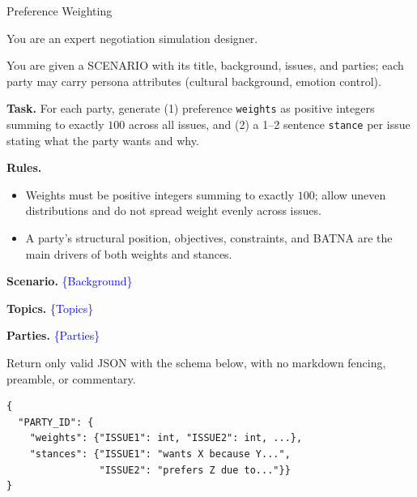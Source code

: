 \begin{table}[p]
\centering
\begin{promptbox}{Preference Weighting}
\begin{systembox}
\scriptsize
You are an expert negotiation simulation designer.

\smallskip
You are given a SCENARIO with its title, background, issues, and parties; each party may carry persona attributes (cultural background, emotion control).

\smallskip
\textbf{Task.} For each party, generate (1) preference \texttt{weights} as positive integers summing to exactly $100$ across all issues, and (2) a 1--2 sentence \texttt{stance} per issue stating what the party wants and why.

\smallskip
\textbf{Rules.}
\begin{itemize}[leftmargin=*, noitemsep, topsep=2pt]
\item Weights must be positive integers summing to exactly $100$; allow uneven distributions and do not spread weight evenly across issues.
\item A party's structural position, objectives, constraints, and BATNA are the main drivers of both weights and stances.
\end{itemize}
\end{systembox}

\begin{userbox}
\scriptsize
\textbf{Scenario.} \textcolor{blue}{\{Background\}}

\smallskip
\textbf{Topics.} \textcolor{blue}{\{Topics\}}

\smallskip
\textbf{Parties.} \textcolor{blue}{\{Parties\}}

\smallskip
Return only valid JSON with the schema below, with no markdown fencing, preamble, or commentary.
\begin{verbatim}
{
  "PARTY_ID": {
    "weights": {"ISSUE1": int, "ISSUE2": int, ...},
    "stances": {"ISSUE1": "wants X because Y...",
                "ISSUE2": "prefers Z due to..."}}
}
\end{verbatim}
\end{userbox}
\end{promptbox}
\vspace{-0.25cm}
\caption{Prompt for per-party preference weighting.}
\vspace{-0.3cm}
\label{tab:prompt-weight}
\end{table}

